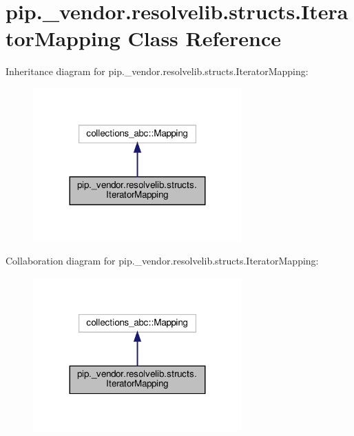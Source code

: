 \hypertarget{classpip_1_1__vendor_1_1resolvelib_1_1structs_1_1IteratorMapping}{}\section{pip.\+\_\+vendor.\+resolvelib.\+structs.\+Iterator\+Mapping Class Reference}
\label{classpip_1_1__vendor_1_1resolvelib_1_1structs_1_1IteratorMapping}


Inheritance diagram for pip.\+\_\+vendor.\+resolvelib.\+structs.\+Iterator\+Mapping\+:
\nopagebreak
\begin{figure}[H]
\begin{center}
\leavevmode
\includegraphics[width=227pt]{classpip_1_1__vendor_1_1resolvelib_1_1structs_1_1IteratorMapping__inherit__graph}
\end{center}
\end{figure}


Collaboration diagram for pip.\+\_\+vendor.\+resolvelib.\+structs.\+Iterator\+Mapping\+:
\nopagebreak
\begin{figure}[H]
\begin{center}
\leavevmode
\includegraphics[width=227pt]{classpip_1_1__vendor_1_1resolvelib_1_1structs_1_1IteratorMapping__coll__graph}
\end{center}
\end{figure}
